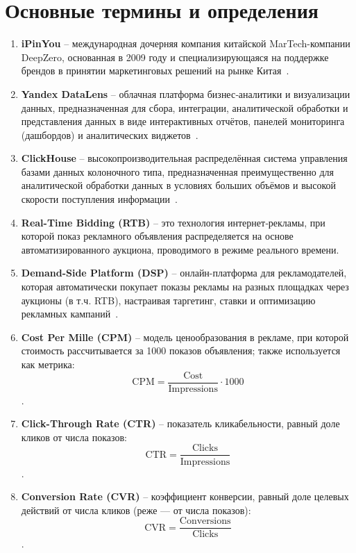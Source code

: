 \section{Основные термины и определения}
\begin{enumerate}

\item \textbf{iPinYou} -- международная дочерняя компания китайской MarTech-компании DeepZero, основанная в 2009 году и специализирующаяся на поддержке брендов в принятии маркетинговых решений на рынке Китая~\cite{ipinyou}.

\item \textbf{Yandex DataLens} -- облачная платформа бизнес‑аналитики и визуализации данных, предназначенная для сбора, интеграции, аналитической обработки и представления данных в виде интерактивных отчётов, панелей мониторинга (дашбордов) и аналитических виджетов~\cite{datalens}.

\item \textbf{ClickHouse} -- высокопроизводительная распределённая система управления базами данных колоночного типа, предназначенная преимущественно для аналитической обработки данных в условиях больших объёмов и высокой скорости поступления информации~\cite{clickhouse}.

\item \textbf{Real-Time Bidding (RTB)} -- это технология интернет‑рекламы, при которой показ рекламного объявления распределяется на основе автоматизированного аукциона, проводимого в режиме реального времени.

\item \textbf{Demand-Side Platform (DSP)} -- онлайн-платформа для рекламодателей, которая автоматически покупает показы рекламы на разных площадках через аукционы (в т.ч. RTB), настраивая таргетинг, ставки и оптимизацию рекламных кампаний~\cite{dsp}.

\item \textbf{Cost Per Mille (CPM)} -- модель ценообразования в рекламе, при которой стоимость рассчитывается за 1000 показов объявления; также используется как метрика: \[\text{CPM}=\frac{\text{Cost}}{\text{Impressions}}\cdot 1000\].

\item \textbf{Click-Through Rate (CTR)} -- показатель кликабельности, равный доле кликов от числа показов: \[\text{CTR}=\frac{\text{Clicks}}{\text{Impressions}}\].

\item \textbf{Conversion Rate (CVR)} -- коэффициент конверсии, равный доле целевых действий от числа кликов (реже — от числа показов): \[\text{CVR}=\frac{\text{Conversions}}{\text{Clicks}}\].


\end{enumerate}
